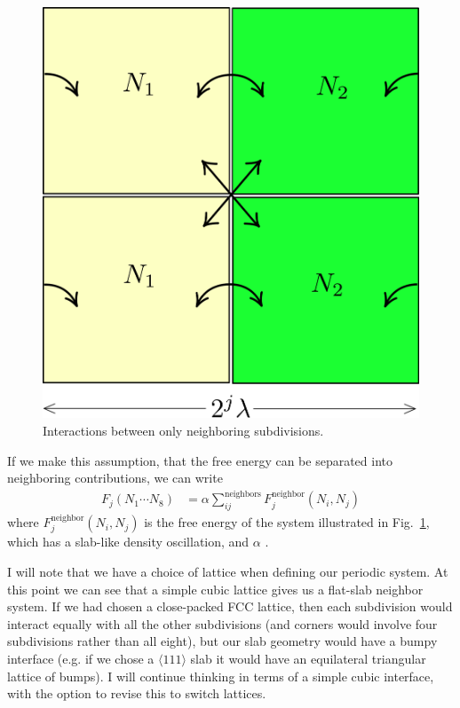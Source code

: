 \documentclass[letterpaper,twocolumn,amsmath,amssymb,pre,aps,10pt]{revtex4-1}
\newcommand{\fixme}[1]{{\bf\color{red}{[#1]}}}
\begin{document}
\begin{figure}
  \centering
  \includegraphics[width=0.8\columnwidth]{figs/neighbors}
  \caption{Interactions between only neighboring subdivisions.}\label{fig:neighbors}
\end{figure}

If we make this assumption, that the free energy can be separated into
neighboring contributions, we can write
\begin{align}
  F_j(N_1\cdots N_8) &= \alpha \sum_{ij}^{\text{neighbors}} F_j^{\text{neighbor}}(N_i, N_j)
\end{align}
where $F_j^{\text{neighbor}}(N_i, N_j)$ is the free energy of the
system illustrated in Fig.~\ref{fig:neighbors}, which has a slab-like
density oscillation, and $\alpha$ \fixme{is a prefactor that I need to
  work out}.

I will note that we have a choice of lattice when defining our
periodic system.  At this point we can see that a simple cubic lattice
gives us a flat-slab neighbor system.  If we had chosen a close-packed
FCC lattice, then each subdivision would interact equally with all the
other subdivisions (and corners would involve four subdivisions rather
than all eight), but our slab geometry would have a bumpy interface
(e.g. if we chose a $\langle 111\rangle$ slab it would have an
equilateral triangular lattice of bumps).  I will continue thinking in
terms of a simple cubic interface, with the option to revise this to
switch lattices.
\end{document}

